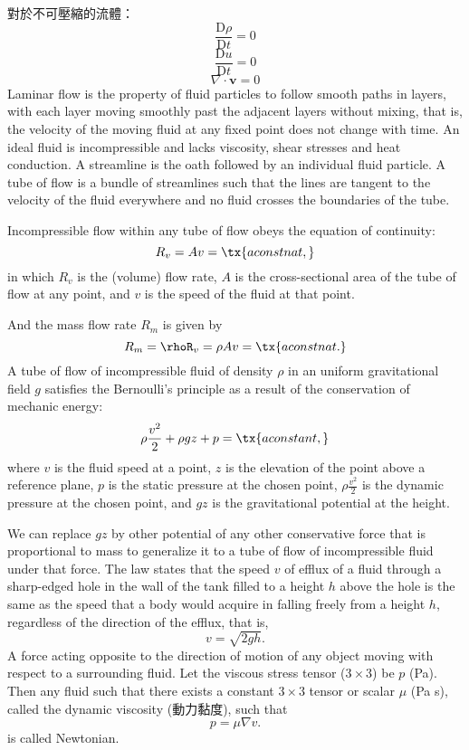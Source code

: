 \documentclass[a4paper,12pt]{article}
\begin{document}
對於不可壓縮的流體：
\[\frac{\mathrm{D}\rho}{\mathrm{D}t}=0\]
\[\frac{\mathrm{D}u}{\mathrm{D}t}=0\]
\[\nabla\cdot\mathbf{v}=0\]
Laminar flow is the property of fluid particles to follow smooth paths in layers, with each layer moving smoothly past the adjacent layers without mixing, that is, the velocity of the moving fluid at any fixed point does not change with time.
An ideal fluid is incompressible and lacks viscosity, shear stresses and heat conduction.
A streamline is the oath followed by an individual fluid particle.
A tube of flow is a bundle of streamlines such that the lines are tangent to the velocity of the fluid everywhere and no fluid crosses the boundaries of the tube.

Incompressible flow within any tube of flow obeys the equation of continuity:
\[R_v=Av=\tx{a constnat,}\]
in which $R_v$ is the (volume) flow rate, $A$ is the cross-sectional area of the tube of flow at any point, and $v$ is the speed of the fluid at that point.

And the mass flow rate $R_m$ is given by
\[R_m=\rhoR_v=\rho Av=\tx{a constnat.}\]
A tube of flow of incompressible fluid of density $\rho$ in an uniform gravitational field $g$ satisfies the Bernoulli's principle as a result of the conservation of mechanic energy:
\[\rho\frac{v^2}{2}+\rho gz+p=\tx{a constant,}\]
where $v$ is the fluid speed at a point, $z$ is the elevation of the point above a reference plane, $p$ is the static pressure at the chosen point, $\rho\frac{v^2}{2}$ is the dynamic pressure at the chosen point, and $gz$ is the gravitational potential at the height.

We can replace $gz$ by other potential of any other conservative force that is proportional to mass to generalize it to a tube of flow of incompressible fluid under that force.
The law states that the speed $v$ of efflux of a fluid through a sharp-edged hole in the wall of the tank filled to a height $h$ above the hole is the same as the speed that a body would acquire in falling freely from a height $h$, regardless of the direction of the efflux, that is,
\[v=\sqrt{2gh}.\]
A force acting opposite to the direction of motion of any object moving with respect to a surrounding fluid.
Let the viscous stress tensor ($3\times 3$) be $p$ (Pa). Then any fluid such that there exists a constant $3\times 3$ tensor or scalar $\mu$ (Pa s), called the dynamic viscosity (動力黏度), such that
\[p=\mu\nabla v.\]
is called Newtonian.
\end{document}
